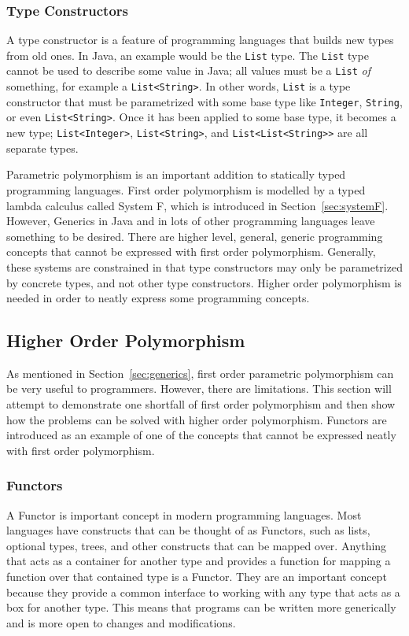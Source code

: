 \subsubsection{Type Constructors}
A type constructor is a feature of programming languages that builds new types
from old ones. In Java, an example would be the \lstinline{List} type. The
\lstinline{List} type cannot be used to describe some value in Java; all values
must be a \lstinline{List} \textit{of} something, for example a
\lstinline{List<String>}.  In other words, \lstinline{List} is a type
constructor that must be parametrized with some base type like
\lstinline{Integer}, \lstinline{String}, or even \lstinline{List<String>}. Once
it has been applied to some base type, it becomes a new type;
\lstinline{List<Integer>}, \lstinline{List<String>}, and
\lstinline{List<List<String>>} are all separate types.

Parametric polymorphism is an important addition to statically typed
programming languages. First order polymorphism is modelled by a typed lambda
calculus called System F, which is introduced in Section~\ref{sec:systemF}.
However, Generics in Java and in lots of other programming languages leave
something to be desired.  There are higher level, general, generic programming
concepts that cannot be expressed with first order polymorphism. Generally,
these systems are constrained in that type constructors may only be
parametrized by concrete types, and not other type constructors. Higher order
polymorphism is needed in order to neatly express some programming concepts.

\subsection{Higher Order Polymorphism}
As mentioned in Section~\ref{sec:generics}, first order parametric polymorphism
can be very useful to programmers.  However, there are limitations. This
section will attempt to demonstrate one shortfall of first order polymorphism
and then show how the problems can be solved with higher order polymorphism.
Functors are introduced as an example of one of the concepts that cannot be
expressed neatly with first order polymorphism.

\subsubsection{Functors}
A Functor is important concept in modern programming languages. Most languages
have constructs that can be thought of as Functors, such as lists, optional types,
trees, and other constructs that can be mapped over. Anything that acts as a
container for another type and provides a function for mapping a function over
that contained type is a Functor. They are an important concept because they
provide a common interface to working with any type that acts as a box for
another type. This means that programs can be written more generically and is
more open to changes and modifications.

